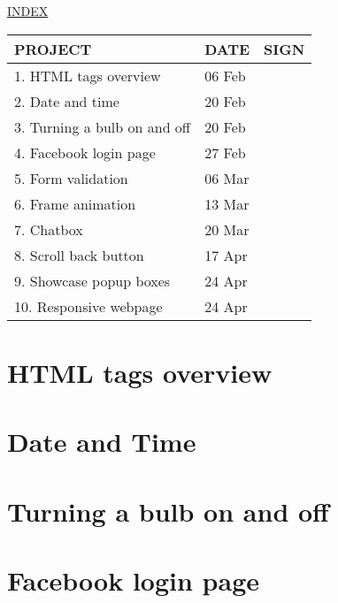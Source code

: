 \documentclass[12pt]{article}
\begin{document}

\Huge
{}
\centering \underline{INDEX} \\
\vspace*{3\baselineskip}
\setlength{\arrayrulewidth}{0.4mm}
\renewcommand{\arraystretch}{1.8}
\setlength{\tabcolsep}{10pt}

\LARGE
\begin{tabular}{|m{8.5cm}|m{2.2cm}|m{3cm}|}
  \hline
  PROJECT & DATE & SIGN \\
  \hline
  \hline
  1. HTML tags overview & 06 Feb & \\
  2. Date and time & 20 Feb & \\
  3. Turning a bulb on and off & 20 Feb & \\
  4. Facebook login page & 27 Feb & \\
  5. Form validation & 06 Mar & \\
  6. Frame animation & 13 Mar & \\
  7. Chatbox & 20 Mar & \\
  8. Scroll back button & 17 Apr & \\
  9. Showcase popup boxes & 24 Apr & \\
  10. Responsive webpage & 24 Apr & \\
  \hline
\end{tabular}
\newpage
\restoregeometry
\normalsize

\section{HTML tags overview}
\newpage

\section{Date and Time}

\section{Turning a bulb on and off}
\newpage

\section{Facebook login page}
\newpage
\end{document}
